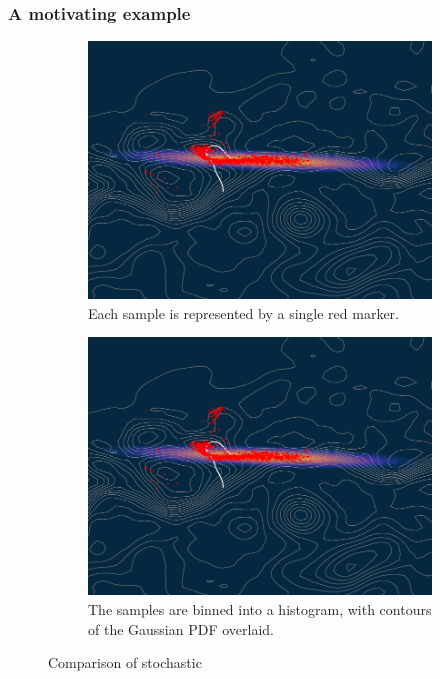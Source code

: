 \subsubsection{A motivating example}



\begin{figure}
	\begin{center}
		\begin{subfigure}{0.8\textwidth}
			\includegraphics[width=\textwidth]{figures/gulf_stream_motivation/single_gaussian.pdf}
			\caption{Each sample is represented by a single red marker.}
			\label{fig:}
		\end{subfigure}
		\begin{subfigure}{0.8\textwidth}
			\includegraphics[width=\textwidth]{figures/gulf_stream_motivation/single_gaussian.pdf}
			\caption{The samples are binned into a histogram, with contours of the Gaussian PDF overlaid.}
			\label{fig:}
		\end{subfigure}
		\caption{Comparison of stochastic}
	\end{center}
\end{figure}




